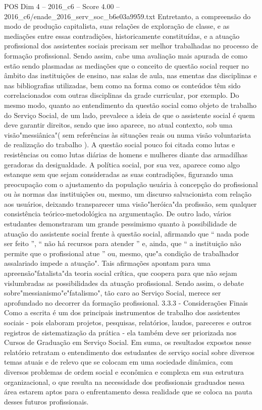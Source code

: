 \begin{textsample}{POS Dim 4 – 2016\_c6 – Score 4.00 – 2016\_c6/enade\_2016\_serv\_soc\_b6e03a9959.txt}
Entretanto, a compreensão do modo de produção capitalista, suas relações de exploração de classe, e as mediações entre essas contradições, historicamente constituídas, e a atuação profissional dos assistentes sociais precisam ser melhor trabalhadas no processo de formação profissional.
Sendo assim, cabe uma avaliação mais apurada de como estão sendo plasmadas as mediações que o conceito de questão social requer no âmbito das instituições de ensino, nas salas de aula, nas ementas das disciplinas e nas bibliografias utilizadas, bem como na forma como os conteúdos têm sido correlacionados com outras disciplinas da grade curricular, por exemplo.
Do mesmo modo, quanto ao entendimento da questão social como objeto de trabalho do Serviço Social, de um lado, prevalece a ideia de que o assistente social é quem deve garantir direitos, sendo que isso aparece, no atual contexto, sob uma visão"messiânica"( sem referências às situações reais ou numa visão voluntarista de realização do trabalho ).
A questão social pouco foi citada como lutas e resistências ou como lutas diárias de homens e mulheres diante das armadilhas geradoras da desigualdade.
A política social, por sua vez, aparece como algo estanque sem que sejam consideradas as suas contradições, figurando uma preocupação com o ajustamento da população usuária à concepção do profissional ou às normas das instituições ou, mesmo, um discurso salvacionista com relação aos usuários, deixando transparecer uma visão"heróica"da profissão, sem qualquer consistência teórico-metodológica na argumentação.
De outro lado, vários estudantes demonstraram um grande pessimismo quanto à possibilidade de atuação do assistente social frente à questão social, afirmando que “ nada pode ser feito ”, “ não há recursos para atender ” e, ainda, que “ a instituição não permite que o profissional atue ” ou, mesmo, que"a condição de trabalhador assalariado impede a atuação".
Tais afirmações apontam para uma apreensão"fatalista"da teoria social crítica, que coopera para que não sejam vislumbradas as possibilidades da atuação profissional.
Sendo assim, o debate sobre"messianismo"e"fatalismo", tão caro ao Serviço Social, merece ser aprofundado no decorrer da formação profissional. 3.3.3 - Considerações Finais Como a escrita é um dos principais instrumentos de trabalho dos assistentes sociais - pois elaboram projetos, pesquisas, relatórios, laudos, pareceres e outros registros de sistematização da prática - ela também deve ser priorizada nos Cursos de Graduação em Serviço Social.
Em suma, os resultados expostos nesse relatório retratam o entendimento dos estudantes de serviço social sobre diversos temas atuais e de relevo que se colocam em uma sociedade dinâmica, com diversos problemas de ordem social e econômica e complexa em sua estrutura organizacional, o que resulta na necessidade dos profissionais graduados nessa área estarem aptos para o enfrentamento dessa realidade que se coloca na pauta desses futuros profissionais.

\end{textsample}
